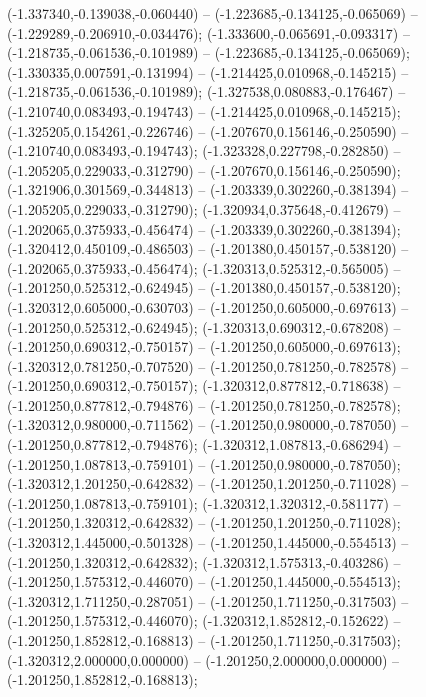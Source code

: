  (-1.337340,-0.139038,-0.060440) -- (-1.223685,-0.134125,-0.065069) -- (-1.229289,-0.206910,-0.034476);
 (-1.333600,-0.065691,-0.093317) -- (-1.218735,-0.061536,-0.101989) -- (-1.223685,-0.134125,-0.065069);
 (-1.330335,0.007591,-0.131994) -- (-1.214425,0.010968,-0.145215) -- (-1.218735,-0.061536,-0.101989);
 (-1.327538,0.080883,-0.176467) -- (-1.210740,0.083493,-0.194743) -- (-1.214425,0.010968,-0.145215);
 (-1.325205,0.154261,-0.226746) -- (-1.207670,0.156146,-0.250590) -- (-1.210740,0.083493,-0.194743);
 (-1.323328,0.227798,-0.282850) -- (-1.205205,0.229033,-0.312790) -- (-1.207670,0.156146,-0.250590);
 (-1.321906,0.301569,-0.344813) -- (-1.203339,0.302260,-0.381394) -- (-1.205205,0.229033,-0.312790);
 (-1.320934,0.375648,-0.412679) -- (-1.202065,0.375933,-0.456474) -- (-1.203339,0.302260,-0.381394);
 (-1.320412,0.450109,-0.486503) -- (-1.201380,0.450157,-0.538120) -- (-1.202065,0.375933,-0.456474);
 (-1.320313,0.525312,-0.565005) -- (-1.201250,0.525312,-0.624945) -- (-1.201380,0.450157,-0.538120);
 (-1.320312,0.605000,-0.630703) -- (-1.201250,0.605000,-0.697613) -- (-1.201250,0.525312,-0.624945);
 (-1.320313,0.690312,-0.678208) -- (-1.201250,0.690312,-0.750157) -- (-1.201250,0.605000,-0.697613);
 (-1.320312,0.781250,-0.707520) -- (-1.201250,0.781250,-0.782578) -- (-1.201250,0.690312,-0.750157);
 (-1.320312,0.877812,-0.718638) -- (-1.201250,0.877812,-0.794876) -- (-1.201250,0.781250,-0.782578);
 (-1.320312,0.980000,-0.711562) -- (-1.201250,0.980000,-0.787050) -- (-1.201250,0.877812,-0.794876);
 (-1.320312,1.087813,-0.686294) -- (-1.201250,1.087813,-0.759101) -- (-1.201250,0.980000,-0.787050);
 (-1.320312,1.201250,-0.642832) -- (-1.201250,1.201250,-0.711028) -- (-1.201250,1.087813,-0.759101);
 (-1.320312,1.320312,-0.581177) -- (-1.201250,1.320312,-0.642832) -- (-1.201250,1.201250,-0.711028);
 (-1.320312,1.445000,-0.501328) -- (-1.201250,1.445000,-0.554513) -- (-1.201250,1.320312,-0.642832);
 (-1.320312,1.575313,-0.403286) -- (-1.201250,1.575312,-0.446070) -- (-1.201250,1.445000,-0.554513);
 (-1.320312,1.711250,-0.287051) -- (-1.201250,1.711250,-0.317503) -- (-1.201250,1.575312,-0.446070);
 (-1.320312,1.852812,-0.152622) -- (-1.201250,1.852812,-0.168813) -- (-1.201250,1.711250,-0.317503);
 (-1.320312,2.000000,0.000000) -- (-1.201250,2.000000,0.000000) -- (-1.201250,1.852812,-0.168813);
